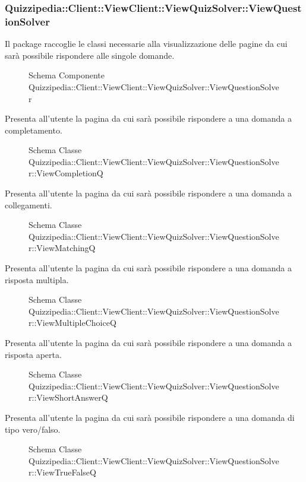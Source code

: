 \subsubsection{Quizzipedia::Client::ViewClient::ViewQuizSolver::ViewQuestionSolver}
Il package raccoglie le classi necessarie alla visualizzazione delle pagine da cui sarà possibile rispondere alle singole domande.
\begin{figure}[H]
\centering
\noindent{}
\caption{Schema Componente Quizzipedia::Client::ViewClient::ViewQuizSolver::ViewQuestionSolver}
\end{figure}
Presenta all'utente la pagina da cui sarà possibile rispondere a una domanda a completamento.
\begin{figure}[H]
\centering
\noindent{}
\caption{Schema Classe Quizzipedia::Client::ViewClient::ViewQuizSolver::ViewQuestionSolver::ViewCompletionQ}
\end{figure}
Presenta all'utente la pagina da cui sarà possibile rispondere a una domanda a collegamenti.
\begin{figure}[H]
\centering
\noindent{}
\caption{Schema Classe Quizzipedia::Client::ViewClient::ViewQuizSolver::ViewQuestionSolver::ViewMatchingQ}
\end{figure}
Presenta all'utente la pagina da cui sarà possibile rispondere a una domanda a risposta multipla.
\begin{figure}[H]
\centering
\noindent{}
\caption{Schema Classe Quizzipedia::Client::ViewClient::ViewQuizSolver::ViewQuestionSolver::ViewMultipleChoiceQ}
\end{figure}
Presenta all'utente la pagina da cui sarà possibile rispondere a una domanda a risposta aperta.
\begin{figure}[H]
\centering
\noindent{}
\caption{Schema Classe Quizzipedia::Client::ViewClient::ViewQuizSolver::ViewQuestionSolver::ViewShortAnswerQ}
\end{figure}
Presenta all'utente la pagina da cui sarà possibile rispondere a una domanda di tipo vero/falso.
\begin{figure}[H]
\centering
\noindent{}
\caption{Schema Classe Quizzipedia::Client::ViewClient::ViewQuizSolver::ViewQuestionSolver::ViewTrueFalseQ}
\end{figure}
